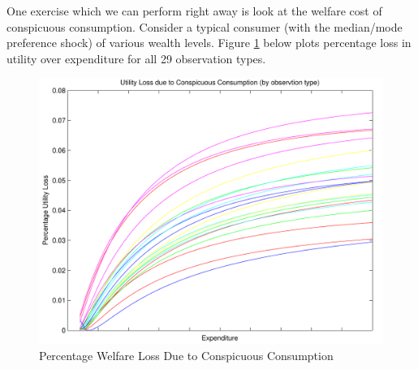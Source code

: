 \documentclass{article}
\begin{document}
One exercise which we can perform right away is look at the welfare cost of conspicuous consumption.
Consider a typical consumer (with the median/mode preference shock) of various wealth levels.  
Figure \ref{fig:wellos} below plots percentage loss in utility over expenditure for all 29 observation types.

\begin{figure}
	\begin{center}
		\includegraphics[scale=.8]{pics/wellos_cropped.pdf}
	\end{center}
	\caption{Percentage Welfare Loss Due to Conspicuous Consumption}
	\label{fig:wellos}
\end{figure}



\end{document}
